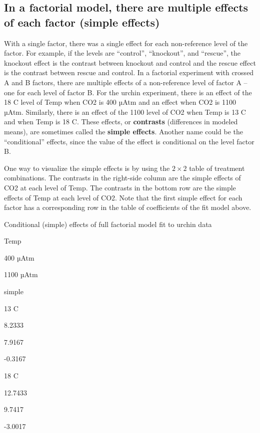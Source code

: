 \documentclass[]{book}
\begin{document}
\hypertarget{in-a-factorial-model-there-are-multiple-effects-of-each-factor-simple-effects}{%
\subsection{In a factorial model, there are multiple effects of each factor (simple effects)}\label{in-a-factorial-model-there-are-multiple-effects-of-each-factor-simple-effects}}

With a single factor, there was a single effect for each non-reference level of the factor. For example, if the levels are ``control'', ``knockout'', and ``rescue'', the knockout effect is the contrast between knockout and control and the rescue effect is the contrast between rescue and control. In a factorial experiment with crossed A and B factors, there are multiple effects of a non-reference level of factor A -- one for each level of factor B. For the urchin experiment, there is an effect of the 18 C level of Temp when CO2 is 400 µAtm and an effect when CO2 is 1100 µAtm. Similarly, there is an effect of the 1100 level of CO2 when Temp is 13 C and when Temp is 18 C. These effects, or \textbf{contrasts} (differences in modeled means), are sometimes called the \textbf{simple effects}. Another name could be the ``conditional'' effects, since the value of the effect is conditional on the level factor B.

One way to visualize the simple effects is by using the \(2 \times 2\) table of treatment combinations. The contrasts in the right-side column are the simple effects of CO2 at each level of Temp. The contrasts in the bottom row are the simple effects of Temp at each level of CO2. Note that the first simple effect for each factor has a corresponding row in the table of coefficients of the fit model above.

\label{tab:factorial-simple}Conditional (simple) effects of full factorial model fit to urchin data

Temp

400 µAtm

1100 µAtm

simple

13 C

8.2333

7.9167

-0.3167

18 C

12.7433

9.7417

-3.0017
\end{document}

